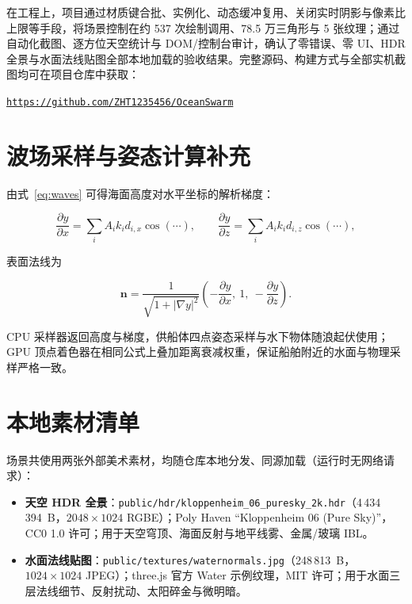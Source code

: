 \documentclass[UTF8, a4paper, 11pt]{ctexart}
\newcommand{\file}[1]{\texttt{#1}}
\newcommand{\repolink}{\href{https://github.com/ZHT1235456/OceanSwarm}{\texttt{https://github.com/ZHT1235456/OceanSwarm}}}
\begin{document}
在工程上，项目通过材质键合批、实例化、动态缓冲复用、关闭实时阴影与像素比上限等手段，将场景控制在约 537 次绘制调用、78.5 万三角形与 5 张纹理；通过自动化截图、逐方位天空统计与 DOM/控制台审计，确认了零错误、零 UI、HDR 全景与水面法线贴图全部本地加载的验收结果。完整源码、构建方式与全部实机截图均可在项目仓库中获取：

\begin{center}
\repolink
\end{center}

\appendix
\section{波场采样与姿态计算补充}

由式~\eqref{eq:waves} 可得海面高度对水平坐标的解析梯度：

\begin{equation}
\frac{\partial y}{\partial x}=\sum_i A_i k_i d_{i,x}\cos(\cdots),\qquad
\frac{\partial y}{\partial z}=\sum_i A_i k_i d_{i,z}\cos(\cdots),
\end{equation}

表面法线为

\begin{equation}
\mathbf{n}=\frac{1}{\sqrt{1+|\nabla y|^2}}\left(-\frac{\partial y}{\partial x},\ 1,\ -\frac{\partial y}{\partial z}\right).
\end{equation}

CPU 采样器返回高度与梯度，供船体四点姿态采样与水下物体随浪起伏使用；GPU 顶点着色器在相同公式上叠加距离衰减权重，保证船舶附近的水面与物理采样严格一致。

\section{本地素材清单}

场景共使用两张外部美术素材，均随仓库本地分发、同源加载（运行时无网络请求）：

\begin{itemize}
  \item \textbf{天空 HDR 全景}：\file{public/hdr/kloppenheim\_06\_puresky\_2k.hdr}（4\,434\,394~B，$2048\times1024$ RGBE）；Poly Haven “Kloppenheim 06 (Pure Sky)”，CC0 1.0 许可；用于天空穹顶、海面反射与地平线雾、金属/玻璃 IBL。
  \item \textbf{水面法线贴图}：\file{public/textures/waternormals.jpg}（248\,813~B，$1024\times1024$ JPEG）；three.js 官方 Water 示例纹理，MIT 许可；用于水面三层法线细节、反射扰动、太阳碎金与微明暗。
\end{itemize}
\end{document}
